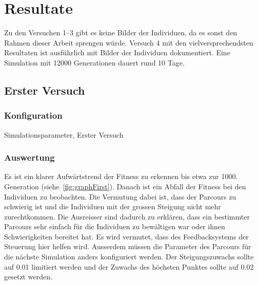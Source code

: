 %
%

\chapter{Resultate\label{chap:Resultate}}

  Zu den Versuchen 1--3 gibt es keine Bilder der Individuen, da es sonst den Rahmen dieser Arbeit sprengen würde.
  Versuch 4 mit den vielversprechendsten Resultaten ist ausführlich mit Bilder der Individuen dokumentiert.
  Eine Simulation mit 12000 Generationen dauert rund 10 Tage.

  \section{Erster Versuch}

    \subsection{Konfiguration}

      \begin{table}[H]
        \centering
        
        \caption{Simulationsparameter, Erster Versuch}
      \end{table}

    \subsection{Auswertung}

      Es ist ein klarer Aufwärtstrend der Fitness zu erkennen bis etwa zur 1000. Generation (siehe~\vref{fig:graphFirst}).
      Danach ist ein Abfall der Fitness bei den Individuen zu beobachten.
      Die Vermutung dabei ist,
      dass der Parcours zu schwierig ist und die Individuen mit der grossen Steigung nicht mehr zurechtkommen.
      Die Ausreisser sind dadurch zu erklären,
      dass ein bestimmter Parcours sehr einfach für die Individuen zu bewältigen war oder ihnen Schwierigkeiten bereitet hat.
      Es wird vermutet, dass des Feedbacksystems der Steuerung hier helfen wird.
      Ausserdem müssen die Parameter des Parcours für die nächste Simulation anders konfiguriert werden.
      Der Steigungszuwachs sollte auf 0.01 limitiert werden und der Zuwachs des höchsten Punktes
      sollte auf 0.02 gesetzt werden.


